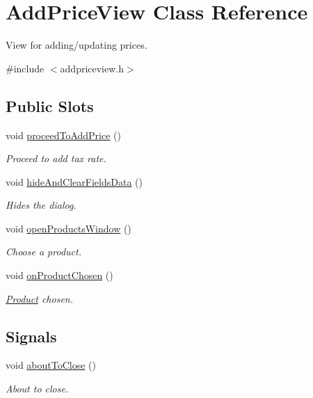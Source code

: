 \hypertarget{class_add_price_view}{\section{\-Add\-Price\-View \-Class \-Reference}
\label{class_add_price_view}
}


\-View for adding/updating prices.  




{\ttfamily \#include $<$addpriceview.\-h$>$}

\subsection*{\-Public \-Slots}
\begin{DoxyCompactItemize}
\item 
void \hyperlink{class_add_price_view_a1f273247f2121a74aea3c723a7e73ef8}{proceed\-To\-Add\-Price} ()
\begin{DoxyCompactList}\small\item\em \-Proceed to add tax rate. \end{DoxyCompactList}\item 
void \hyperlink{class_add_price_view_afd903d276c8d66f9e35946cf928de91c}{hide\-And\-Clear\-Fields\-Data} ()
\begin{DoxyCompactList}\small\item\em \-Hides the dialog. \end{DoxyCompactList}\item 
void \hyperlink{class_add_price_view_a7d6f616d7d272b6635cfc0d1227982d3}{open\-Products\-Window} ()
\begin{DoxyCompactList}\small\item\em \-Choose a product. \end{DoxyCompactList}\item 
void \hyperlink{class_add_price_view_a39ceec41f0494f4ce57a823250bc422c}{on\-Product\-Chosen} ()
\begin{DoxyCompactList}\small\item\em \hyperlink{class_product}{\-Product} chosen. \end{DoxyCompactList}\end{DoxyCompactItemize}
\subsection*{\-Signals}
\begin{DoxyCompactItemize}
\item 
void \hyperlink{class_add_price_view_a56c853c6d7ddc9e06796d8a1cca4f69d}{about\-To\-Close} ()
\begin{DoxyCompactList}\small\item\em \-About to close. \end{DoxyCompactList}\end{DoxyCompactItemize}
